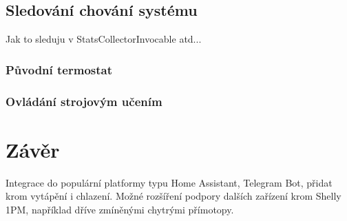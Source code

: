 \section{Sledování chování systému}
Jak to sleduju v StatsCollectorInvocable atd...


\subsection{Původní termostat}



\subsection{Ovládání strojovým učením}


\chapter{Závěr}
\label{zaver}

Integrace do populární platformy typu Home Assistant, Telegram Bot, přidat krom vytápění i chlazení. Možné rozšíření podpory dalších zařízení krom Shelly 1PM, například dříve zmíněnými chytrými přímotopy.

